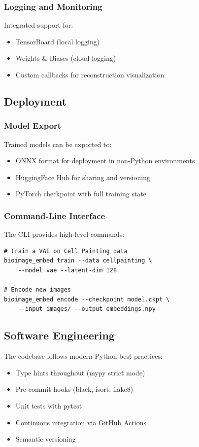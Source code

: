 \subsubsection{Logging and Monitoring}

Integrated support for:
\begin{itemize}
    \item TensorBoard (local logging)
    \item Weights \& Biases (cloud logging)
    \item Custom callbacks for reconstruction visualization
\end{itemize}

\subsection{Deployment}

\subsubsection{Model Export}

Trained models can be exported to:
\begin{itemize}
    \item ONNX format for deployment in non-Python environments
    \item HuggingFace Hub for sharing and versioning
    \item PyTorch checkpoint with full training state
\end{itemize}

\subsubsection{Command-Line Interface}

The CLI provides high-level commands:

\begin{verbatim}
# Train a VAE on Cell Painting data
bioimage_embed train --data cellpainting \
    --model vae --latent-dim 128

# Encode new images
bioimage_embed encode --checkpoint model.ckpt \
    --input images/ --output embeddings.npy
\end{verbatim}

\subsection{Software Engineering}

The codebase follows modern Python best practices:
\begin{itemize}
    \item Type hints throughout (mypy strict mode)
    \item Pre-commit hooks (black, isort, flake8)
    \item Unit tests with pytest
    \item Continuous integration via GitHub Actions
    \item Semantic versioning
\end{itemize}

